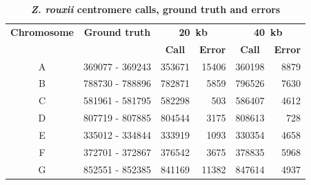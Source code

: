 \begin{table}[ht!]
\caption{\textbf{\textit{Z. rouxii} centromere calls, ground truth and errors}}
\begin{center}
\begin{tabular}{c | c  r  r  r  r}
\textbf{Chromosome}  & \textbf{Ground truth} & \multicolumn{2}{c}{\textbf{20~kb}} & \multicolumn{2}{c}{\textbf{40~kb}} \\
  &   &  \multicolumn{1}{c}{\textbf{Call}} &  \multicolumn{1}{c}{\textbf{Error}} &  \multicolumn{1}{c}{\textbf{Call}} &  \multicolumn{1}{c}{\textbf{Error}} \\
\hline
A & \num[group-separator={\,}]{369077} - \num[group-separator={\,}]{369243} & \num[group-separator={\,}]{353671} & \small{\num[group-separator={\,}]{15406}}  & \num[group-separator={\,}]{360198} & \small{\num[group-separator={\,}]{8879}}  \\
B & \num[group-separator={\,}]{788730} - \num[group-separator={\,}]{788896} & \num[group-separator={\,}]{782871} & \small{\num[group-separator={\,}]{5859}}  & \num[group-separator={\,}]{796526} & \small{\num[group-separator={\,}]{7630}}  \\
C & \num[group-separator={\,}]{581961} - \num[group-separator={\,}]{581795} & \num[group-separator={\,}]{582298} & \small{\num[group-separator={\,}]{503}}  & \num[group-separator={\,}]{586407} & \small{\num[group-separator={\,}]{4612}}  \\
D & \num[group-separator={\,}]{807719} - \num[group-separator={\,}]{807885} & \num[group-separator={\,}]{804544} & \small{\num[group-separator={\,}]{3175}}  & \num[group-separator={\,}]{808613} & \small{\num[group-separator={\,}]{728}}  \\
E & \num[group-separator={\,}]{335012} - \num[group-separator={\,}]{334844} & \num[group-separator={\,}]{333919} & \small{\num[group-separator={\,}]{1093}}  & \num[group-separator={\,}]{330354} & \small{\num[group-separator={\,}]{4658}}  \\
F & \num[group-separator={\,}]{372701} - \num[group-separator={\,}]{372867} & \num[group-separator={\,}]{376542} & \small{\num[group-separator={\,}]{3675}}  & \num[group-separator={\,}]{378835} & \small{\num[group-separator={\,}]{5968}}  \\
G & \num[group-separator={\,}]{852551} - \num[group-separator={\,}]{852385} & \num[group-separator={\,}]{841169} & \small{\num[group-separator={\,}]{11382}}  & \num[group-separator={\,}]{847614} & \small{\num[group-separator={\,}]{4937}}  \\
\end{tabular}
\end{center}
\end{table}

